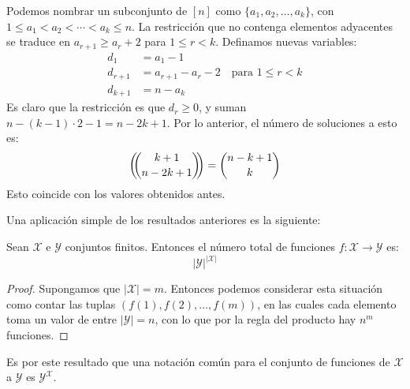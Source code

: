   Podemos nombrar un subconjunto de \([n]\)
  como \(\{ a_1, a_2, \dotsc, a_k \}\),
  con \(1 \le a_1 < a_2 < \dotsb < a_k \le n\).
  La restricción que no contenga elementos adyacentes
  se traduce en \(a_{r + 1} \ge a_r + 2\)
  para \(1 \le r < k\).
  Definamos nuevas variables:
  \begin{align*}
    d_1
      &= a_1 - 1 \\
    d_{r + 1}
      &= a_{r + 1} - a_r - 2 \quad \text{para \(1 \le r < k\)} \\
    d_{k + 1}
      &= n - a_k
  \end{align*}
  Es claro que la restricción es que \(d_r \ge 0\),
  y suman \(n - (k - 1) \cdot 2 - 1 = n - 2 k + 1\).
  Por lo anterior,
  el número de soluciones a esto es:
  \begin{equation*}
    \left( \!\! \binom{k + 1}{n - 2 k + 1} \!\! \right)
      = \binom{n - k + 1}{k}
  \end{equation*}
  Esto coincide con los valores obtenidos antes.

  Una aplicación simple de los resultados anteriores
  es la siguiente:
  \begin{theorem}
    \label{theo:numero-funciones}
    Sean \(\mathcal{X}\) e \(\mathcal{Y}\) conjuntos finitos.
    Entonces el número total
    de funciones
      \(f \colon \mathcal{X} \rightarrow \mathcal{Y}\) es:
    \begin{equation*}
      \lvert \mathcal{Y} \rvert^{\lvert \mathcal{X} \rvert}
    \end{equation*}
  \end{theorem}
  \begin{proof}
    Supongamos que \(\lvert \mathcal{X} \rvert = m\).
    Entonces podemos considerar esta situación
    como contar las tuplas
    \((f(1), f(2), \dotsc, f(m))\),
    en las cuales cada elemento
    toma un valor de entre \(\lvert \mathcal{Y} \rvert = n\),
    con lo que por la regla del producto hay \(n^m\) funciones.
  \end{proof}
  Es por este resultado que una notación común
  para el conjunto de funciones de \(\mathcal{X}\) a \(\mathcal{Y}\)
  es \(\mathcal{Y}^{\mathcal{X}}\).

